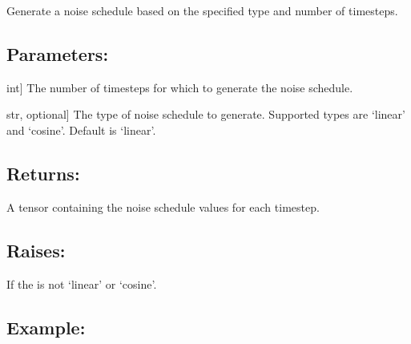\documentclass[a4paper,10pt,english]{sphinxmanual}
\begin{document}
\begin{fulllineitems}
\label{\detokenize{models:fireDiff.Models.utils.noise_schedule}}
\pysigstartsignatures
{}
\pysigstopsignatures
\sphinxAtStartPar
Generate a noise schedule based on the specified type and number of
timesteps.


\subsection{Parameters:}
\label{\detokenize{models:id53}}\begin{description}
\sphinxlineitem{timesteps}{[}int{]}
\sphinxAtStartPar
The number of timesteps for which to generate the noise schedule.

\sphinxlineitem{schedule\_type}{[}str, optional{]}
\sphinxAtStartPar
The type of noise schedule to generate. Supported types are ‘linear’
and ‘cosine’.
Default is ‘linear’.

\end{description}


\subsection{Returns:}
\label{\detokenize{models:id54}}\begin{description}
\sphinxAtStartPar
A tensor containing the noise schedule values for each timestep.

\end{description}


\subsection{Raises:}
\label{\detokenize{models:raises}}\begin{description}
\sphinxAtStartPar
If the  is not ‘linear’ or ‘cosine’.

\end{description}


\subsection{Example:}
\label{\detokenize{models:id55}}
\begin{sphinxVerbatim}[commandchars=\\\{\}]
  
   
\end{sphinxVerbatim}


\end{fulllineitems}
\end{document}
